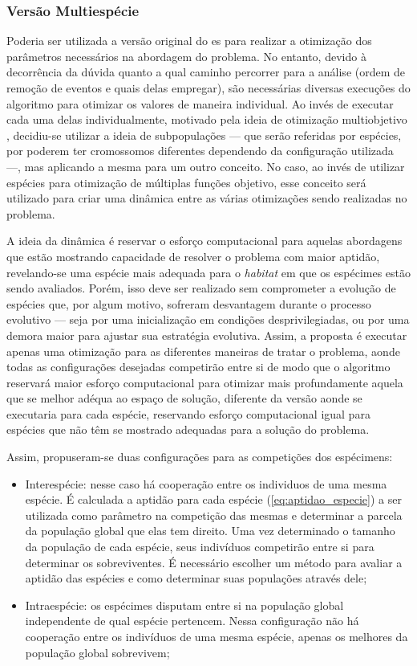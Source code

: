 \subsubsection{Versão Multiespécie}
\label{sssec:multiespecie}

Poderia ser utilizada a versão original do \acs{es} para realizar a
otimização dos parâmetros necessários na abordagem do problema. No
entanto, devido à decorrência da dúvida quanto a qual caminho
percorrer para a análise (ordem de remoção de eventos e quais delas
empregar), são necessárias diversas execuções
do algoritmo para otimizar os valores de maneira individual. Ao invés
de executar cada uma delas individualmente, motivado pela ideia de otimização
multiobjetivo \cite[cap. 9]{eiben2003introduction}, decidiu-se utilizar
a ideia de subpopulações --- que serão referidas por espécies, por
poderem ter cromossomos diferentes dependendo da configuração
utilizada ---, mas aplicando a mesma para um outro conceito. No caso,
ao invés de utilizar espécies para otimização de múltiplas funções
objetivo, esse conceito será utilizado para criar uma dinâmica
entre as várias otimizações sendo realizadas no problema.

A ideia da dinâmica é reservar o esforço computacional para aquelas
abordagens que estão mostrando capacidade de resolver o problema com
maior aptidão, revelando-se uma espécie mais adequada para o
\emph{habitat} em que os espécimes estão sendo avaliados. Porém, isso
deve ser realizado sem comprometer a evolução de espécies que, por
algum motivo, sofreram desvantagem durante o processo evolutivo ---
seja por uma inicialização em condições desprivilegiadas, ou por uma
demora maior para ajustar sua estratégia evolutiva. Assim, a proposta
é executar apenas uma otimização para as diferentes maneiras de
tratar o problema, aonde todas as configurações desejadas
competirão entre si de modo que o algoritmo reservará maior
esforço computacional para otimizar mais profundamente aquela que se
melhor adéqua ao espaço de solução, diferente da versão aonde se
executaria para cada espécie, reservando esforço computacional igual
para espécies que não têm se mostrado adequadas para a solução do
problema.

Assim, propuseram-se duas configurações para as competições dos
espécimens:

\begin{itemize}
\item Interespécie: nesse caso há cooperação entre os individuos de
uma mesma espécie. É calculada a aptidão para cada espécie
(\ref{eq:aptidao_especie}) a ser utilizada como parâmetro na
competição das mesmas e determinar a parcela da população global que
elas tem direito. Uma vez determinado o tamanho da população de cada
espécie, seus indivíduos competirão entre si para determinar os
sobreviventes. É necessário escolher um método para avaliar a aptidão
das espécies e como determinar suas populações através dele;
\item Intraespécie: os espécimes disputam entre si na população global
independente de qual espécie pertencem. Nessa configuração não há
cooperação entre os indivíduos de uma mesma espécie, apenas os
melhores da população global sobrevivem;
\end{itemize}

